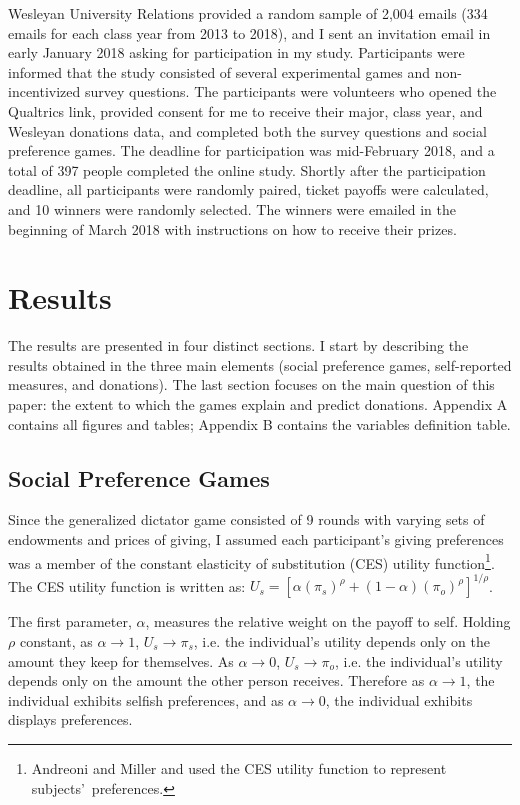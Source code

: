 \documentclass[12pt]{article}
\begin{document}
Wesleyan University Relations provided a random sample of 2,004 emails (334 emails for each class year from 2013 to 2018), and I sent an invitation email in early January 2018 asking for participation in my study. Participants were informed that the study consisted of several experimental games and non-incentivized survey questions. The participants were volunteers who opened the Qualtrics link, provided consent for me to receive their major, class year, and Wesleyan donations data, and completed both the survey questions and social preference games. The deadline for participation was mid-February 2018, and a total of 397 people completed the online study. Shortly after the participation deadline, all participants were randomly paired, ticket payoffs were calculated, and 10 winners were randomly selected. The winners were emailed in the beginning of March 2018 with instructions on how to receive their prizes.

\section{Results}
The results are presented in four distinct sections. I start by describing the results obtained in the three main elements (social preference games, self-reported measures, and donations). The last section focuses on the main question of this paper: the extent to which the games explain and predict donations. Appendix A contains all figures and tables; Appendix B contains the variables definition table.

\subsection{Social Preference Games}
Since the generalized dictator game consisted of 9 rounds with varying sets of endowments and prices of giving, I assumed each participant\rq s giving preferences was a member of the constant elasticity of substitution (CES) utility function\footnote{Andreoni and Miller and \cite{fisman_kariv_markovits_2007} used the CES utility function to represent subjects\rq \ preferences.}.  The CES utility function is written as: \(U_{s} = [\alpha(\pi_{s})^{\rho} + (1-\alpha)(\pi_{o})^{\rho}]^{1/\rho}\).

The first parameter, \(\alpha\), measures the relative weight on the payoff to self. Holding \(\rho\) constant, as \(\alpha \rightarrow 1\), \(U_{s} \rightarrow \pi_{s}\), i.e. the individual\rq s utility depends only on the amount they keep for themselves. As \(\alpha \rightarrow 0\), \(U_{s} \rightarrow \pi_{o}\), i.e. the individual\rq s utility depends only on the amount the other person receives. Therefore as \(\alpha \rightarrow 1\), the individual exhibits selfish preferences, and as \(\alpha \rightarrow 0\), the individual exhibits displays preferences.
\end{document}
